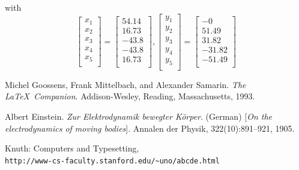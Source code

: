 \documentclass[11pt]{report}
\begin{document}
with
\[
    \begin{bmatrix}
    x_1 \\
    x_2 \\
    x_3 \\
    x_4 \\
    x_5 \\
    \end{bmatrix} 
    =
    \begin{bmatrix}
        54.14 \\
        16.73 \\
        -43.8 \\
        -43.8 \\
        16.73 \\
    \end{bmatrix},
        \begin{bmatrix}
    y_1 \\
    y_2 \\
    y_3 \\
    y_4 \\
    y_5 \\
    \end{bmatrix}  =
    \begin{bmatrix}
    -0 \\
    51.49 \\
    31.82 \\
    -31.82 \\
    -51.49 \\
    \end{bmatrix} 
\]

\begin{thebibliography}{9}
    Michel Goossens, Frank Mittelbach, and Alexander Samarin. 
    \textit{The \LaTeX\ Companion}. 
    Addison-Wesley, Reading, Massachusetts, 1993.
    
    Albert Einstein. 
    \textit{Zur Elektrodynamik bewegter K{\"o}rper}. (German) 
    [\textit{On the electrodynamics of moving bodies}]. 
    Annalen der Physik, 322(10):891–921, 1905.
    
    Knuth: Computers and Typesetting,
    \\\texttt{http://www-cs-faculty.stanford.edu/\~{}uno/abcde.html}
\end{thebibliography}
\end{document}
